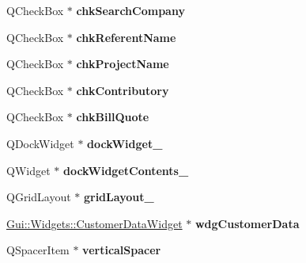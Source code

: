 \begin{DoxyCompactItemize}
\item 
\hypertarget{classUi__MainWindow_adfc0e92b865139e6ea3db2fbcd385bd8}{Q\-Check\-Box $\ast$ {\bfseries chk\-Search\-Company}}\label{classUi__MainWindow_adfc0e92b865139e6ea3db2fbcd385bd8}

\item 
\hypertarget{classUi__MainWindow_ad38e3252483d62254b3af6d5dcd11897}{Q\-Check\-Box $\ast$ {\bfseries chk\-Referent\-Name}}\label{classUi__MainWindow_ad38e3252483d62254b3af6d5dcd11897}

\item 
\hypertarget{classUi__MainWindow_add886bb84761059b0ccb9b8cd55dd339}{Q\-Check\-Box $\ast$ {\bfseries chk\-Project\-Name}}\label{classUi__MainWindow_add886bb84761059b0ccb9b8cd55dd339}

\item 
\hypertarget{classUi__MainWindow_a149984ae5266d5df63ce47172fefe8d6}{Q\-Check\-Box $\ast$ {\bfseries chk\-Contributory}}\label{classUi__MainWindow_a149984ae5266d5df63ce47172fefe8d6}

\item 
\hypertarget{classUi__MainWindow_a24e9ba30a8a7759d56cbffd60576a60b}{Q\-Check\-Box $\ast$ {\bfseries chk\-Bill\-Quote}}\label{classUi__MainWindow_a24e9ba30a8a7759d56cbffd60576a60b}

\item 
\hypertarget{classUi__MainWindow_a7e5fac9829c83eb1a1d9a2e2a34facae}{Q\-Dock\-Widget $\ast$ {\bfseries dock\-Widget\-\_}}\label{classUi__MainWindow_a7e5fac9829c83eb1a1d9a2e2a34facae}

\item 
\hypertarget{classUi__MainWindow_aa582921b029b95e76e2a4ca8f1442ae9}{Q\-Widget $\ast$ {\bfseries dock\-Widget\-Contents\-\_}}\label{classUi__MainWindow_aa582921b029b95e76e2a4ca8f1442ae9}

\item 
\hypertarget{classUi__MainWindow_a8731b71c513ff94baf59614807823c5d}{Q\-Grid\-Layout $\ast$ {\bfseries grid\-Layout\-\_}}\label{classUi__MainWindow_a8731b71c513ff94baf59614807823c5d}

\item 
\hypertarget{classUi__MainWindow_ab2199bb1f103965d1918a4df0d3f69f3}{\hyperlink{classGui_1_1Widgets_1_1CustomerDataWidget}{Gui\-::\-Widgets\-::\-Customer\-Data\-Widget} $\ast$ {\bfseries wdg\-Customer\-Data}}\label{classUi__MainWindow_ab2199bb1f103965d1918a4df0d3f69f3}

\item 
\hypertarget{classUi__MainWindow_a8384329c3663ff274e926a12024aab52}{Q\-Spacer\-Item $\ast$ {\bfseries vertical\-Spacer}}\label{classUi__MainWindow_a8384329c3663ff274e926a12024aab52}


\end{DoxyCompactItemize}
